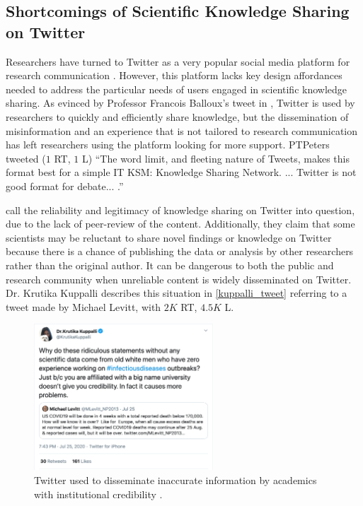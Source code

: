 \documentclass[acmsmall,authordraft]{acmart}
\begin{document}
\subsection{Shortcomings of Scientific Knowledge Sharing on Twitter}
\label{Shortcomings of Scientific Knowledge Sharing on Twitter}

Researchers have turned to Twitter as a very popular social media platform for research communication \citep{collins2016scientists, ke2017systematic, van2011scientists}. However, this platform lacks key design affordances needed to address the particular needs of users engaged in scientific knowledge sharing. As evinced by Professor Francois Balloux's tweet in 
, Twitter is used by researchers to quickly and efficiently share knowledge, but the dissemination of misinformation and an experience that is not tailored to research communication has left researchers using the platform looking for more support.
PTPeters tweeted ($1$ RT, $1$ L) ``The word limit, and fleeting nature of Tweets, makes this format best for a simple IT KSM: Knowledge Sharing Network. ... Twitter is not good format for debate... \citep{Peters2020twitter}.''

\citet{lacassin2020rapid} call the reliability and legitimacy of knowledge sharing on Twitter into question, due to the lack of peer-review of the content. Additionally, they claim that some scientists may be reluctant to share novel findings or knowledge on Twitter because there is a chance of publishing the data or analysis by other researchers rather than the original author. It can be dangerous to both the public and research community when unreliable content is widely disseminated on Twitter. Dr. Krutika Kuppalli describes this situation in \autoref{kuppalli_tweet} referring to a tweet made by Michael Levitt, with $2K$ RT, $4.5K$ L.

\begin{figure}
  \includegraphics[width=0.6\textwidth]{Pictures/kuppalli_tweet.png}
  \caption{Twitter used to disseminate inaccurate information by academics with institutional credibility \citep{kuppalli2020twitter}.}
  \label{kuppalli_tweet}
\end{figure}
\end{document}

